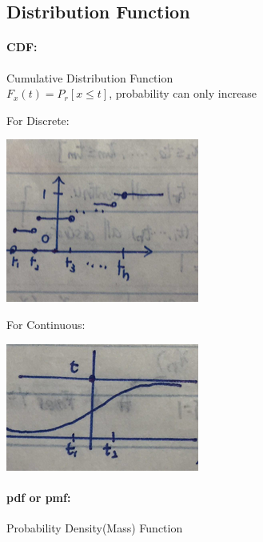 \documentclass{article}
\begin{document}
    \subsection{Distribution Function}{
        \paragraph{CDF: }{
            Cumulative Distribution Function\\
            $ F_x(t)= P_r[x\le t]$, probability can only increase\\

            \begin{enumerate}{
                \item For Discrete:
                    \begin{center}{
                        \includegraphics{discreterv.png}
                    }
                    \end{center} 
                \item For Continuous:
                    \begin{center}{
                        \includegraphics{cdf.png}
                    }
                    \end{center}  
            }
            \end{enumerate}
            
              
        }
        \paragraph{pdf or pmf: }{
            Probability Density(Mass) Function\\
            
}}
\end{document}
